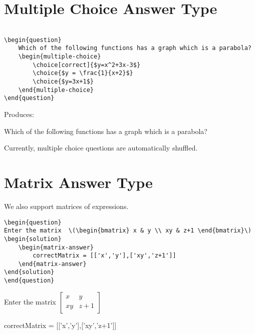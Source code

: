 \documentclass{ximera}
\begin{document}
\section{Multiple Choice Answer Type}

\begin{verbatim}

\begin{question}
	Which of the following functions has a graph which is a parabola?
	\begin{multiple-choice}
		\choice[correct]{$y=x^2+3x-3$}
		\choice{$y = \frac{1}{x+2}$}
		\choice{$y=3x+1$}
	\end{multiple-choice}
\end{question}
\end{verbatim}

Produces:

\begin{question}
	Which of the following functions has a graph which is a parabola?
	\begin{multiple-choice}
	\end{multiple-choice}
\end{question}

Currently, multiple choice questions are automatically shuffled.

\section{Matrix Answer Type}

We also support matrices of expressions.

\begin{verbatim}
\begin{question}
Enter the matrix  \(\begin{bmatrix} x & y \\ xy & z+1 \end{bmatrix}\)
\begin{solution}
    \begin{matrix-answer}
	    correctMatrix = [['x','y'],['xy','z+1']]
    \end{matrix-answer}
\end{solution}
\end{question}
\end{verbatim}

\begin{question}
Enter the matrix  \(\begin{bmatrix} x & y \\ xy & z+1 \end{bmatrix}\)
\begin{solution}
    \begin{matrix-answer}
	    correctMatrix = [['x','y'],['xy','z+1']]
    \end{matrix-answer}
\end{solution}
\end{question}
\end{document}
